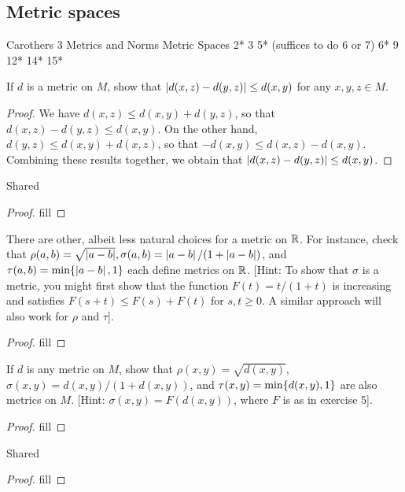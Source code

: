 \subsection{Metric spaces}

Carothers 3 Metrics and Norms
Metric Spaces
2*
3
5* (suffices to do 6 or 7)
6*
9
12*
14*
15*


\begin{exercise}{2}
If $d$ is a metric on $M$, show that $\left\lvert d(x,z)-d(y,z)\right\rvert\leq d(x,y)$ for any $x,y,z\in M$.
\end{exercise}
\begin{proof}
We have $d(x,z)\leq d(x,y)+d(y,z)$, so that $d(x,z)-d(y,z)\leq d(x,y)$. On the other hand, $d(y,z)\leq d(x,y)+d(x,z)$, so that $-d(x,y)\leq d(x,z)-d(x,y)$. Combining these results together, we obtain that $\left\lvert d(x,z)-d(y,z)\right\rvert\leq d(x,y)$.
\end{proof} 

\begin{exercise}{3}
Shared
\end{exercise}
\begin{proof}
fill
\end{proof} 

\begin{exercise}{5}
There are other, albeit less natural choices for a metric on $\mathbb{R}$. For instance, check that $\rho(a,b)=\sqrt{\left\lvert a-b\right\rvert},\sigma(a,b)=\left\lvert a-b\right\rvert/(1+\left\lvert a-b\right\rvert)$, and $\tau(a,b)=\min\{\left\lvert a-b\right\rvert,1\}$ each define metrics on $\mathbb{R}$. [Hint: To show that $\sigma$ is a metric, you might first show that the function $F(t)=t/(1+t)$ is increasing and satisfies $F(s+t)\leq F(s)+F(t)$ for $s,t\geq 0$. A similar approach will also work for $\rho$ and $\tau$].
\end{exercise}
\begin{proof}
fill
\end{proof} 

\begin{exercise}{6}
If $d$ is any metric on $M$, show that $\rho(x,y)=\sqrt{d(x,y)}$, $\sigma(x,y)=d(x,y)/(1+d(x,y))$, and $\tau(x,y)=\min\{d(x,y),1\}$ are also metrics on $M$. [Hint: $\sigma(x,y)=F(d(x,y))$, where $F$ is as in exercise 5].
\end{exercise}
\begin{proof}
fill
\end{proof} 

\begin{exercise}{9}
Shared
\end{exercise}
\begin{proof}
fill
\end{proof} 

